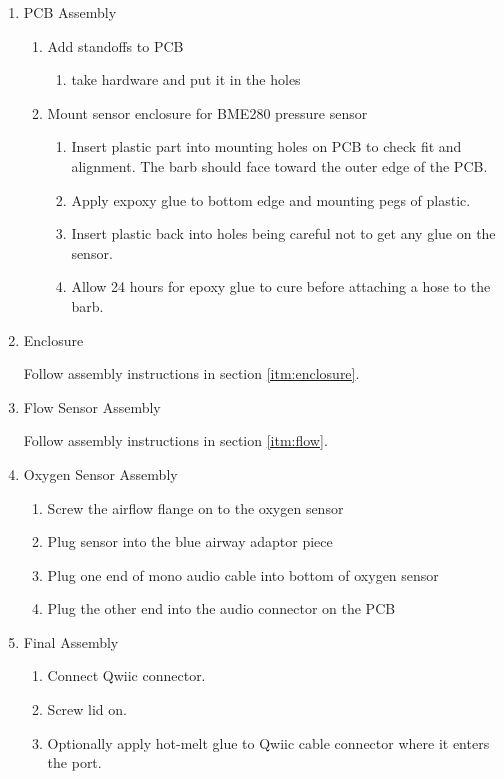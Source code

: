 \documentclass[11pt, letterpaper]{article}
\begin{document}
\begin{enumerate}
\item
PCB Assembly

\begin{enumerate}[label=1.\arabic*]
\item Add standoffs to PCB
\begin{enumerate}[label=1.1.\arabic*]
\item take hardware and put it in the holes
\end{enumerate}

\item Mount sensor enclosure for BME280 pressure sensor
\begin{enumerate}[label=1.2.\arabic*]
\item Insert plastic part into mounting holes on PCB to check fit and alignment. The barb should face toward the outer edge of the PCB.
\item Apply expoxy glue to bottom edge and mounting pegs of plastic.
\item Insert plastic back into holes being careful not to get any glue on the sensor.
\item Allow 24 hours for epoxy glue to cure before attaching a hose to the barb.
\end{enumerate}


\end{enumerate}



\item
Enclosure

Follow assembly instructions in section \ref{itm:enclosure}.


\item
Flow Sensor Assembly

Follow assembly instructions in section \ref{itm:flow}.

\item
Oxygen Sensor Assembly

\begin{enumerate}[label=4.\arabic*]
\item
Screw the airflow flange on to the oxygen sensor
\item
Plug sensor into the blue airway adaptor piece
\item
Plug one end of mono audio cable into bottom of oxygen sensor
\item
Plug the other end into the audio connector on the PCB
\end{enumerate}








\item
  Final Assembly
  \begin{enumerate}[label=4.\arabic*]
  \item Connect Qwiic connector.
  \item Screw lid on.
    \item Optionally apply hot-melt glue to Qwiic cable connector where it enters the port.
    \end{enumerate}

\end{enumerate}
\end{document}

